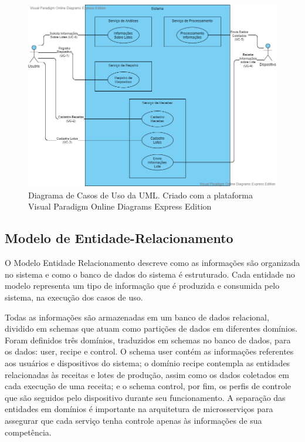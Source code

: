 \begin{figure}[h]
    \centering
    \includegraphics[scale=0.5]{figuras/projeto/software/diagrama_casos_de_uso.png}
    \caption{Diagrama de Casos de Uso da UML. Criado com a plataforma Visual Paradigm Online Diagrams Express Edition}
    \label{fig:usecases}
\end{figure}

\subsection{Modelo de Entidade-Relacionamento}

O Modelo Entidade Relacionamento descreve como as informações são organizada no sistema e como o banco de dados do sistema é estruturado. 
Cada entidade no modelo representa um tipo de informação que é produzida e consumida pelo sistema, na execução dos casos de uso. 

Todas as informações são armazenadas em um banco de dados relacional, dividido em schemas que atuam como partições de dados em diferentes domínios. 
Foram definidos três domínios, traduzidos em schemas no banco de dados, para os dados: user, recipe e control. O schema user contém as informações 
referentes aos usuários e dispositivos do sistema; o domínio recipe contempla as entidades relacionadas às receitas e lotes de produção, assim como 
os dados coletados em cada execução de uma receita; e o schema control, por fim, os perfis de controle que são seguidos pelo dispositivo durante 
seu funcionamento. A separação das entidades em domínios é importante na arquitetura de microsserviços para assegurar que cada serviço tenha 
controle apenas às informações de sua competência. 

